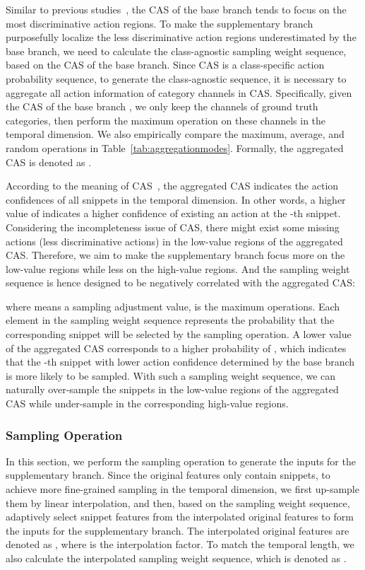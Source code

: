 \documentclass[journal]{IEEEtran}
\begin{document}
Similar to previous studies~\cite{zeng2019breaking,min2020adversarial,zhong2018step}, the CAS of the base branch tends to focus on the most discriminative action regions. To make the supplementary branch purposefully localize the less discriminative action regions underestimated by the base branch, we need to calculate the class-agnostic sampling weight sequence, based on the CAS of the base branch. Since CAS is a class-specific action probability sequence, to generate the class-agnostic sequence, it is necessary to aggregate all action information of category channels in CAS. Specifically, given the CAS of the base branch , we only keep the channels of ground truth categories, then perform the maximum operation on these channels in the temporal dimension. We also empirically compare the maximum, average, and random operations in Table~\ref{tab:aggregationmodes}. Formally, the aggregated CAS is denoted as . 



According to the meaning of CAS~\cite{shou2018autoloc,paul2018w}, the aggregated CAS  indicates the action confidences of all snippets in the temporal dimension. In other words, a higher value of  indicates a higher confidence of existing an action at the -th snippet. Considering the incompleteness issue of CAS, there might exist some missing actions (less discriminative actions) in the low-value regions of the aggregated CAS. Therefore, we aim to make the supplementary branch focus more on the low-value regions while less on the high-value regions. And the sampling weight sequence is hence designed to be negatively correlated with the aggregated CAS:

where  means a sampling adjustment value,  is the maximum operations. Each element in the sampling weight sequence  represents the probability that the corresponding snippet will be selected by the sampling operation. A lower value of the aggregated CAS  corresponds to a higher probability of , which indicates that the -th snippet with lower action confidence determined by the base branch is more likely to be sampled. With such a sampling weight sequence, we can naturally over-sample the snippets in the low-value regions of the aggregated CAS while under-sample in the corresponding high-value regions.



\subsubsection{\textbf{Sampling Operation}}
In this section, we perform the sampling operation to generate the inputs for the supplementary branch. Since the original features only contain  snippets, to achieve more fine-grained sampling in the temporal dimension, we first up-sample them by linear interpolation, and then, based on the sampling weight sequence, adaptively select  snippet features from the interpolated original features to form the inputs for the supplementary branch. The interpolated original features are denoted as , where  is the interpolation factor. To match the temporal length, we also calculate the interpolated sampling weight sequence, which is denoted as .
\end{document}
